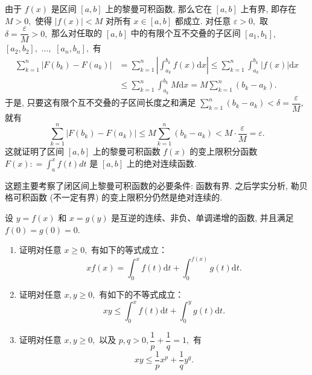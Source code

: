 \begin{solution}
由于 $f(x)$ 是区间 $[a, b]$ 上的黎曼可积函数, 那么它在 $[a, b]$ 上有界, 即存在 $M > 0,$ 使得 $\lvert f(x) \rvert < M$ 对所有 $x \in [a, b]$ 都成立. 对任意 $\varepsilon > 0,$ 取 $\delta = \dfrac{\varepsilon}{M} > 0,$ 那么对任取的 $[a, b]$ 中的有限个互不交叠的子区间 $[a_1, b_1],$ $[a_2, b_2],$ $\dots,$ $[a_n, b_n],$ 有
\begin{align*}
\sum\limits_{k=1}^n \lvert F(b_k) - F(a_k) \rvert & = \sum\limits_{k=1}^n \left\lvert \int_{a_k}^{b_k} f(x) \mathrm{d}x \right\rvert \leqslant \sum\limits_{k=1}^n \int_{a_k}^{b_k} \lvert f(x) \rvert \mathrm{d}x \\
& \leqslant \sum\limits_{k=1}^n \int_{a_k}^{b_k} M \mathrm{d}x = M \sum\limits_{k=1}^n (b_k - a_k).
\end{align*}
于是, 只要这有限个互不交叠的子区间长度之和满足 $\sum\limits_{k=1}^n (b_k - a_k) < \delta = \dfrac{\varepsilon}{M},$ 就有
\[\sum\limits_{k=1}^n \lvert F(b_k) - F(a_k) \rvert \leqslant M \sum\limits_{k=1}^n (b_k - a_k) < M \cdot \dfrac{\varepsilon}{M} = \varepsilon.\]
这就证明了区间 $[a, b]$ 上的黎曼可积函数 $f(x)$ 的变上限积分函数$F(x) : = \int_{a}^{x} f(t) dt$ 是 $[a, b]$ 上的绝对连续函数.

这题主要考察了闭区间上黎曼可积函数的必要条件: 函数有界. 之后学实分析, 勒贝格可积函数 (不一定有界) 的变上限积分仍然是绝对连续的.
\end{solution}

\begin{question}[points = 10]
设 $y = f(x)$ 和 $x = g(y)$ 是互逆的连续、非负、单调递增的函数, 并且满足 $f(0) = g(0) = 0.$
\begin{enumerate}
\item 证明对任意 $x \geqslant 0,$ 有如下的等式成立：
\[xf(x) = \int_0^x f(t) \mathrm{d}t + \int_0^{f(x)} g(t) \mathrm{d}t.\]
\item 证明对任意 $x, y \geqslant 0,$ 有如下的不等式成立：
\[xy \leqslant \int_0^x f(t) \mathrm{d}t + \int_0^y g(t) \mathrm{d}t.\]
\item 证明对任意 $x, y \geqslant 0,$ 以及 $p, q > 0, \dfrac{1}{p} + \dfrac{1}{q} = 1,$ 有
\[xy \leqslant \dfrac{1}{p} x^p + \dfrac{1}{q} y^q.\]
\end{enumerate}

\end{question}

